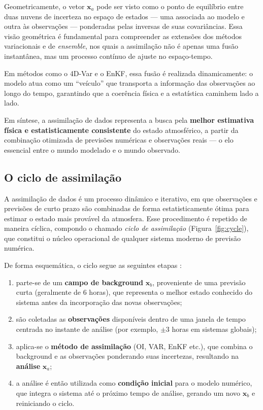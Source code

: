 Geometricamente, o vetor \( \mathbf{x}_a \) pode ser visto como o ponto de equilíbrio entre duas nuvens de incerteza no espaço de estados — uma associada ao modelo e outra às observações — ponderadas pelas inversas de suas covariâncias.  
Essa visão geométrica é fundamental para compreender as extensões dos métodos variacionais e de \textit{ensemble}, nos quais a assimilação não é apenas uma fusão instantânea, mas um processo contínuo de ajuste no espaço-tempo.

Em métodos como o 4D-Var e o EnKF, essa fusão é realizada dinamicamente: o modelo atua como um “veículo” que transporta a informação das observações ao longo do tempo, garantindo que a coerência física e a estatística caminhem lado a lado.

Em síntese, a assimilação de dados representa a busca pela \textbf{melhor estimativa física e estatisticamente consistente} do estado atmosférico, a partir da combinação otimizada de previsões numéricas e observações reais — o elo essencial entre o mundo modelado e o mundo observado.

\subsection*{O ciclo de assimilação}

A assimilação de dados é um processo dinâmico e iterativo, em que observações e previsões de curto prazo são combinadas de forma estatisticamente ótima para estimar o estado mais provável da atmosfera. Esse procedimento é repetido de maneira cíclica, compondo o chamado \textit{ciclo de assimilação} (Figura~\ref{fig:cycle}), que constitui o núcleo operacional de qualquer sistema moderno de previsão numérica.

De forma esquemática, o ciclo segue as seguintes etapas \citep{Kalnay2003}:

\begin{enumerate}
    \item parte-se de um \textbf{campo de background} \( \mathbf{x}_b \), proveniente de uma previsão curta (geralmente de 6 horas), que representa o melhor estado conhecido do sistema antes da incorporação das novas observações;
    \item são coletadas as \textbf{observações} disponíveis dentro de uma janela de tempo centrada no instante de análise (por exemplo, \(\pm 3\) horas em sistemas globais);
    \item aplica-se o \textbf{método de assimilação} (OI, VAR, EnKF etc.), que combina o background e as observações ponderando suas incertezas, resultando na \textbf{análise} \( \mathbf{x}_a \);
    \item a análise é então utilizada como \textbf{condição inicial} para o modelo numérico, que integra o sistema até o próximo tempo de análise, gerando um novo \( \mathbf{x}_b \) e reiniciando o ciclo.
\end{enumerate}

